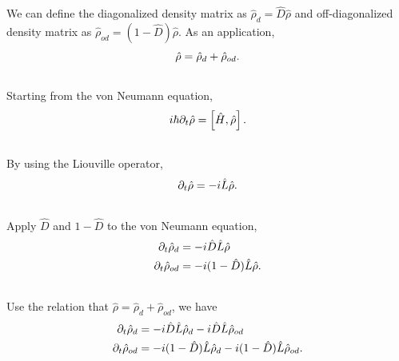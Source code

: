 \documentclass[letterpaper,10pt,english]{sphinxmanual}
\begin{document}
We can define the diagonalized density matrix as $\hat \rho_d = \hat D \hat \rho$ and off-diagonalized density matrix as $\hat \rho_{od} = (1-\hat D)\hat \rho$. As an application,
\begin{gather}
\begin{split}\hat \rho = \hat \rho_d + \hat \rho_{od} .\end{split}\notag\\\begin{split}\end{split}\notag
\end{gather}
Starting from the von Neumann equation,
\begin{gather}
\begin{split}i\hbar \partial_t \hat \rho = \left[\hat H, \hat \rho \right] .\end{split}\notag\\\begin{split}\end{split}\notag
\end{gather}
By using the Liouville operator,
\begin{gather}
\begin{split}\partial_t \hat \rho = -i \hat L \hat \rho .\end{split}\notag\\\begin{split}\end{split}\notag
\end{gather}
Apply $\hat D$ and $1-\hat D$ to the von Neumann equation,
\begin{gather}
\begin{split}\partial_t \hat \rho_d & = -i \hat D  \hat L \hat \rho \\
\partial_t \hat \rho _{od} & = -i (1 - \hat D)  \hat L \hat \rho .\end{split}\notag\\\begin{split}\end{split}\notag
\end{gather}
Use the relation that $\hat \rho = \hat \rho_d + \hat \rho_{od}$, we have
\begin{gather}
\begin{split}\partial_t \hat \rho_d & = -i \hat D  \hat L \hat \rho_d - i \hat D  \hat L \hat \rho _ {od} \\
\partial_t \hat \rho _{od} & = - i (1 - \hat D)  \hat L \hat \rho _ d - i (1 - \hat D)  \hat L \hat \rho_{od}  .\end{split}\notag\\\begin{split}\end{split}\notag
\end{gather}
\end{document}
